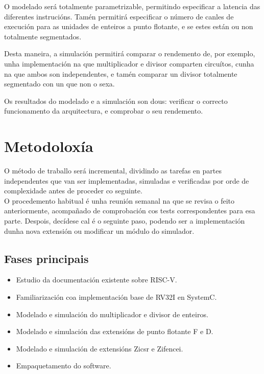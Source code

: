O modelado será totalmente parametrizable, permitindo especificar a latencia das diferentes instrucións. Tamén permitirá especificar o número de canles de execución para as unidades de enteiros a punto flotante, e se estes están ou non totalmente segmentados. 

Desta maneira, a simulación permitirá comparar o rendemento de, por exemplo, unha implementación na que multiplicador e divisor comparten circuítos, cunha na que ambos son independentes, e tamén comparar un divisor totalmente segmentado con un que non o sexa. 

Os resultados do modelado e a simulación son dous: verificar o correcto funcionamento da arquitectura, e comprobar o seu rendemento. 


\section{Metodoloxía}
\label{sec:metodoloxía}
O método de traballo será incremental, dividindo as tarefas en partes independentes que van ser implementadas, simuladas e verificadas por orde de complexidade antes de proceder co seguinte. \\
O procedemento habitual é unha reunión semanal na que se revisa o feito anteriormente, acompañado de comprobación cos tests correspondentes para esa parte. Despois, decídese cal é o seguinte paso, podendo ser a implementación dunha nova extensión ou modificar un módulo do simulador.

\subsection{Fases principais}
\begin{itemize}
    \item Estudio da documentación existente sobre RISC-V.
    \item Familiarización coa implementación base de RV32I en SystemC. 
    \item Modelado e simulación do multiplicador e divisor de enteiros. 
    \item Modelado e simulación das extensións de punto flotante F e D. 
    \item Modelado e simulación de extensións Zicsr e  Zifencei.
    \item Empaquetamento do software. 

\end{itemize}

